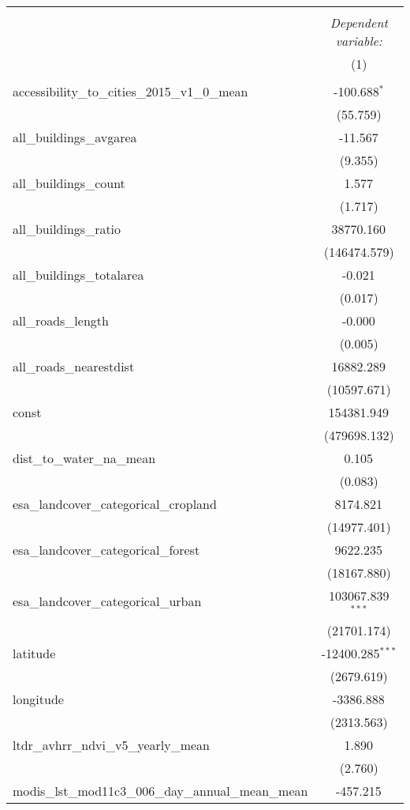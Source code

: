 \begin{table}[!htbp] \centering
\begin{tabular}{@{\extracolsep{5pt}}lc}
\\[-1.8ex]\hline
\hline \\[-1.8ex]
& \multicolumn{1}{c}{\textit{Dependent variable:}} \
\cr \cline{1-2}
\\[-1.8ex] & (1) \\
\hline \\[-1.8ex]
 accessibility_to_cities_2015_v1_0_mean & -100.688$^{*}$ \\
  & (55.759) \\
 all_buildings_avgarea & -11.567$^{}$ \\
  & (9.355) \\
 all_buildings_count & 1.577$^{}$ \\
  & (1.717) \\
 all_buildings_ratio & 38770.160$^{}$ \\
  & (146474.579) \\
 all_buildings_totalarea & -0.021$^{}$ \\
  & (0.017) \\
 all_roads_length & -0.000$^{}$ \\
  & (0.005) \\
 all_roads_nearestdist & 16882.289$^{}$ \\
  & (10597.671) \\
 const & 154381.949$^{}$ \\
  & (479698.132) \\
 dist_to_water_na_mean & 0.105$^{}$ \\
  & (0.083) \\
 esa_landcover_categorical_cropland & 8174.821$^{}$ \\
  & (14977.401) \\
 esa_landcover_categorical_forest & 9622.235$^{}$ \\
  & (18167.880) \\
 esa_landcover_categorical_urban & 103067.839$^{***}$ \\
  & (21701.174) \\
 latitude & -12400.285$^{***}$ \\
  & (2679.619) \\
 longitude & -3386.888$^{}$ \\
  & (2313.563) \\
 ltdr_avhrr_ndvi_v5_yearly_mean & 1.890$^{}$ \\
  & (2.760) \\
 modis_lst_mod11c3_006_day_annual_mean_mean & -457.215$^{}$ \\

\end{tabular}
\end{table}
